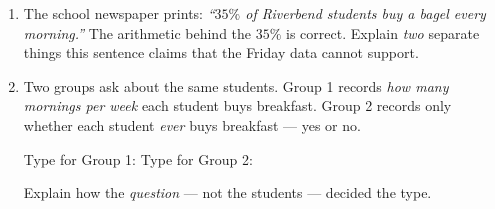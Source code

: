 \documentclass[10pt]{article}
\begin{document}
\vspace{0.08in}

\boxguard
\begin{extensionbox}
\small
\begin{enumerate}[leftmargin=1.6em, itemsep=5pt, topsep=2pt]

  \item The school newspaper prints: \textit{``$35\%$ of Riverbend students buy a bagel
        every morning.''} The arithmetic behind the $35\%$ is correct. Explain \emph{two}
        separate things this sentence claims that the Friday data cannot support.

  \item Two groups ask about the same students. Group 1 records \emph{how many mornings
        per week} each student buys breakfast. Group 2 records only whether each student
        \emph{ever} buys breakfast --- yes or no.

        Type for Group 1: \blank{3.2cm} \hfill Type for Group 2: \blank{3.2cm}

        Explain how the \emph{question} --- not the students --- decided the type.
        \writeline

\end{enumerate}
\end{extensionbox}
\end{document}
